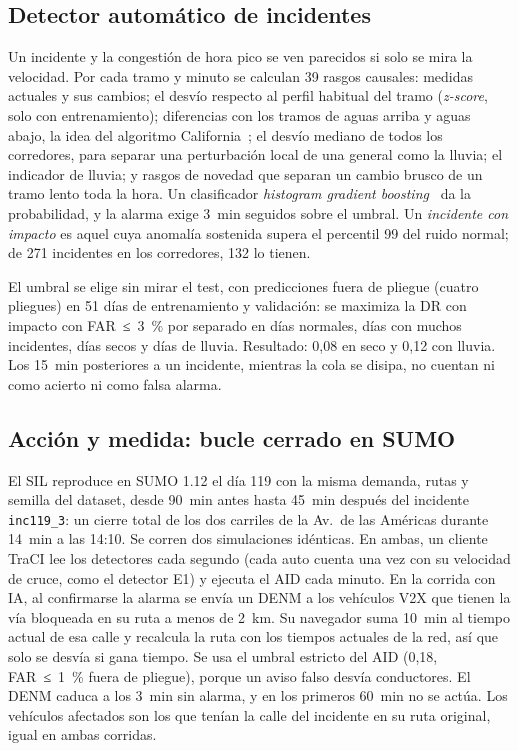 \documentclass[conference,a4paper]{IEEEtran}
\begin{document}
\subsection{Detector automático de incidentes}
Un incidente y la congestión de hora pico se ven parecidos si solo se mira la velocidad. Por cada tramo y minuto se calculan 39 rasgos causales: medidas actuales y sus cambios; el desvío respecto al perfil habitual del tramo (\emph{z-score}, solo con entrenamiento); diferencias con los tramos de aguas arriba y aguas abajo, la idea del algoritmo California~\cite{payne}; el desvío mediano de todos los corredores, para separar una perturbación local de una general como la lluvia; el indicador de lluvia; y rasgos de novedad que separan un cambio brusco de un tramo lento toda la hora. Un clasificador \emph{histogram gradient boosting}~\cite{hgb,sklearn} da la probabilidad, y la alarma exige 3~min seguidos sobre el umbral. Un \emph{incidente con impacto} es aquel cuya anomalía sostenida supera el percentil 99 del ruido normal; de 271 incidentes en los corredores, 132 lo tienen.

El umbral se elige sin mirar el test, con predicciones fuera de pliegue (cuatro pliegues) en 51 días de entrenamiento y validación: se maximiza la DR con impacto con FAR~≤~3~\% por separado en días normales, días con muchos incidentes, días secos y días de lluvia. Resultado: 0,08 en seco y 0,12 con lluvia. Los 15~min posteriores a un incidente, mientras la cola se disipa, no cuentan ni como acierto ni como falsa alarma.

\subsection{Acción y medida: bucle cerrado en SUMO}
El SIL reproduce en SUMO 1.12 el día 119 con la misma demanda, rutas y semilla del dataset, desde 90~min antes hasta 45~min después del incidente \texttt{inc119\_3}: un cierre total de los dos carriles de la Av.~de las Américas durante 14~min a las 14:10. Se corren dos simulaciones idénticas. En ambas, un cliente TraCI lee los detectores cada segundo (cada auto cuenta una vez con su velocidad de cruce, como el detector E1) y ejecuta el AID cada minuto. En la corrida con IA, al confirmarse la alarma se envía un DENM a los vehículos V2X que tienen la vía bloqueada en su ruta a menos de 2~km. Su navegador suma 10~min al tiempo actual de esa calle y recalcula la ruta con los tiempos actuales de la red, así que solo se desvía si gana tiempo. Se usa el umbral estricto del AID (0,18, FAR~≤~1~\% fuera de pliegue), porque un aviso falso desvía conductores. El DENM caduca a los 3~min sin alarma, y en los primeros 60~min no se actúa. Los vehículos afectados son los que tenían la calle del incidente en su ruta original, igual en ambas corridas.
\end{document}
